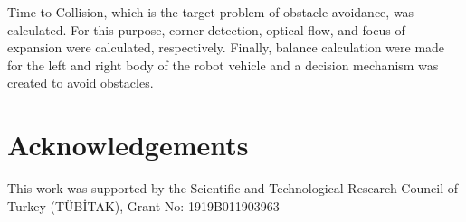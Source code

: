 \documentclass[twocolumn, switch]{article} %
\begin{document}
Time to Collision, which is the target problem of obstacle
avoidance, was calculated. For this purpose, corner
detection, optical flow, and focus of expansion were
calculated, respectively. Finally, balance calculation were
made for the left and right body of the robot vehicle and a
decision mechanism was created to avoid obstacles.



\footnotesize
\section*{Acknowledgements}
This work was supported by the
Scientific and Technological Research Council of Turkey
(TÜBİTAK), Grant No: 1919B011903963
\end{document}
